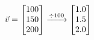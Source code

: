 \documentclass[preview]{standalone}
\begin{document}
\begin{align*}
\special{dvisvgm:raw <g id='unique000'>}\vec{v} = \begin{bmatrix} 100 \\ 150 \\ 200 \end{bmatrix}\xrightarrow{\div 100}\begin{bmatrix} 1.0 \\ 1.5 \\ 2.0 \end{bmatrix}\special{dvisvgm:raw </g>}
\end{align*}
\end{document}
